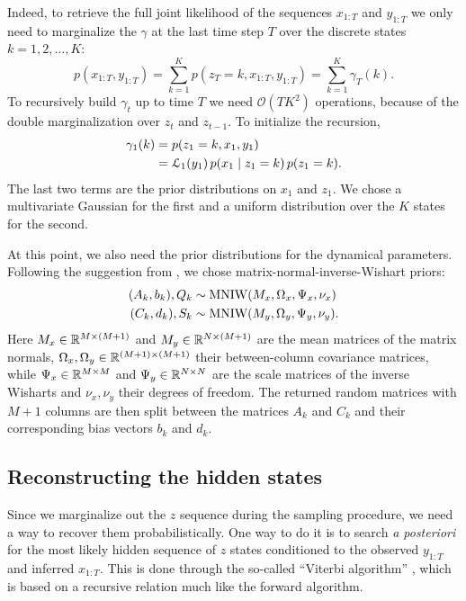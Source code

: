 \documentclass[
  10pt, twocolumn, headings=normal,
  footlines=1, DIV=calc
]{scrartcl}
\begin{document}
Indeed, to retrieve the full joint likelihood of the sequences $x_{1:T}$ and
$y_{1:T}$ we only need to marginalize the $\gamma$ at the last time step $T$
over the discrete states $k = 1, 2, \ldots, K$:
\begin{equation}
  p(x_{1:T}, y_{1:T}) = \sum_{k=1}^{K} p(z_{T} = k, x_{1:T}, y_{1:T})
    = \sum_{k=1}^{K} \gamma_{T} (k).
\end{equation}
To recursively build $\gamma_{t}$ up to time $T$ we need
$\mathcal{O}(TK^{2})$ operations, because of the double marginalization over
$z_{t}$ and $z_{t-1}$. To initialize the recursion,
\begin{equation}
  \begin{split}
    \gamma_{1}(k) &= p(z_{1} = k, x_{1}, y_{1}) \\
                  &= \mathcal{L}_{1}(y_{1}) \,
                    p(x_{1} \;\vert\; z_{1} = k) \, p(z_{1} = k).
  \end{split}
  \label{eq:gamma-1}
\end{equation}
The last two terms are the prior distributions on $x_{1}$ and $z_{1}$. We chose
a multivariate Gaussian for the first and a uniform distribution over the $K$
states for the second. 

At this point, we also need the prior distributions for the dynamical
parameters. Following the suggestion from \textcite{Linderman17}, we chose
matrix-normal-inverse-Wishart priors:
\begin{align}
  (A_{k}, b_{k}), Q_{k} &\sim \operatorname{MNIW}(M_{x}, \Omega_{x}, \Psi_{x}, \nu_{x}) \\
  (C_{k}, d_{k}), S_{k} &\sim \operatorname{MNIW}(M_{y}, \Omega_{y}, \Psi_{y}, \nu_{y}).
\end{align}
Here $M_{x} \in \mathbb{R}^{M \times (M + 1)}$ and $M_{y} \in \mathbb{R}^{N \times (M + 1)}$ are
the mean matrices of the matrix normals, $\Omega_x, \Omega_y \in \mathbb{R}^{(M + 1)
\times (M + 1)}$ their between-column covariance matrices, while $\Psi_x \in
\mathbb{R}^{M \times M}$ and $\Psi_{y} \in \mathbb{R}^{N \times N}$ are the scale matrices of
the inverse Wisharts and $\nu_{x}, \nu_{y}$ their degrees of freedom. The
returned random matrices with $M + 1$ columns are then split between the
matrices $A_{k}$ and $C_{k}$ and their corresponding bias vectors $b_{k}$ and
$d_{k}$.

\subsection{Reconstructing the hidden states}
Since we marginalize out the $z$ sequence during the sampling procedure, we need
a way to recover them probabilistically. One way to do it is to search \emph{a
posteriori} for the most likely hidden sequence of $z$ states conditioned to the
observed $y_{1:T}$ and inferred $x_{1:T}$. This is done through the so-called
\enquote{Viterbi algorithm} \autocite{Stan24}, which is based on a recursive
relation much like the forward algorithm.
\end{document}
